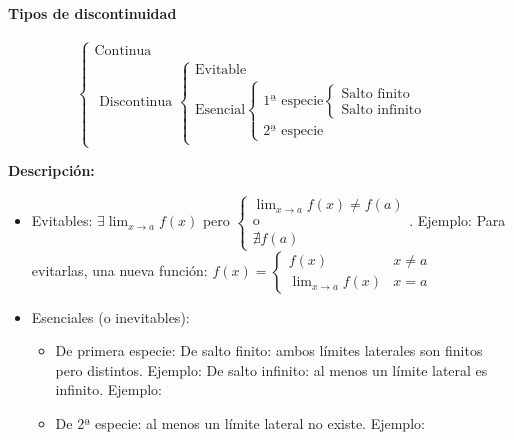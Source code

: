 \paragraph{Tipos de discontinuidad}

\[
\begin{cases} 
	\text{Continua}\\
	\text{ Discontinua }
		\begin{cases}
			\text{Evitable}\\
			\text{Esencial}
				\begin{cases}
					\text{1ª especie}
						\begin{cases}
							\text{Salto finito}\\
							\text{Salto infinito}
						\end{cases}\\
					\text{2ª especie}
				\end{cases}
		\end{cases}
\end{cases}
\]


\textbf{Descripción: } 
\begin{itemize}
	\item Evitables: $\exists \displaystyle\lim_{x\to a}f(x)$ pero $\begin{cases}\displaystyle\lim_{x\to a}f(x) \neq f(a)\\\text{o}\\\nexists f(a)\end{cases}$. Ejemplo: 
	\subitem Para evitarlas, \quad\quad\quad\quad una nueva función: $f(x) = \begin{cases}f(x) & x\neq a\\ \displaystyle\lim_{x\to a}f(x) & x=a \end{cases}$
	\item Esenciales (o inevitables): 
	\begin{itemize}
		\item De primera especie:
		\subitem De salto finito: ambos límites laterales son finitos pero distintos. Ejemplo:
		\subitem De salto infinito: al menos un límite lateral es infinito. Ejemplo:
		\item De 2ª especie: al menos un límite lateral no existe. Ejemplo:
	\end{itemize}
\end{itemize}


